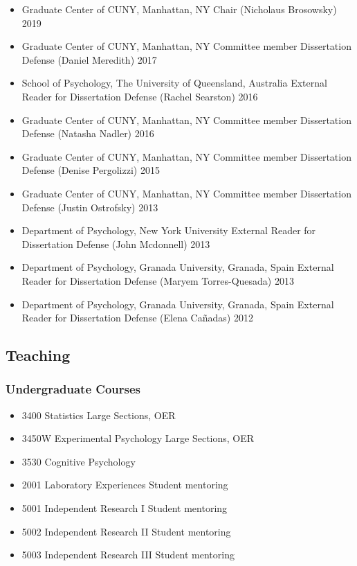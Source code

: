\documentclass[11pt,a4paper,]{moderncv}
\providecommand{\tightlist}{%
	\setlength{\itemsep}{0pt}\setlength{\parskip}{0pt}}
\begin{document}
\begin{itemize}
\tightlist
\item
  Graduate Center of CUNY, Manhattan, NY Chair (Nicholaus Brosowsky) 2019
\item
  Graduate Center of CUNY, Manhattan, NY Committee member Dissertation Defense (Daniel Meredith) 2017
\item
  School of Psychology, The University of Queensland, Australia External Reader for Dissertation Defense (Rachel Searston) 2016
\item
  Graduate Center of CUNY, Manhattan, NY Committee member Dissertation Defense (Natasha Nadler) 2016
\item
  Graduate Center of CUNY, Manhattan, NY Committee member Dissertation Defense (Denise Pergolizzi) 2015
\item
  Graduate Center of CUNY, Manhattan, NY Committee member Dissertation Defense (Justin Ostrofsky) 2013
\item
  Department of Psychology, New York University External Reader for Dissertation Defense (John Mcdonnell) 2013
\item
  Department of Psychology, Granada University, Granada, Spain External Reader for Dissertation Defense (Maryem Torres-Quesada) 2013
\item
  Department of Psychology, Granada University, Granada, Spain External Reader for Dissertation Defense (Elena Cañadas) 2012
\end{itemize}

\hypertarget{teaching}{%
\subsection{Teaching}\label{teaching}}

\hypertarget{undergraduate-courses}{%
\subsubsection{Undergraduate Courses}\label{undergraduate-courses}}

\begin{itemize}
\tightlist
\item
  3400 Statistics Large Sections, OER
\item
  3450W Experimental Psychology Large Sections, OER
\item
  3530 Cognitive Psychology\\
\item
  2001 Laboratory Experiences Student mentoring
\item
  5001 Independent Research I Student mentoring
\item
  5002 Independent Research II Student mentoring
\item
  5003 Independent Research III Student mentoring
\end{itemize}
\end{document}
